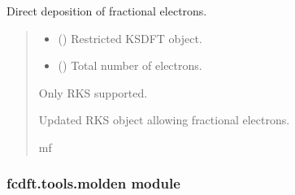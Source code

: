 \documentclass[letterpaper,10pt,english]{sphinxmanual}
\begin{document}
\begin{fulllineitems}
\label{\detokenize{fcdft.tools:fcdft.tools.addons.frac_occ_}}
\pysigstartsignatures
\pysiglinewithargsret
{}
{\sphinxparamcomma {}}
{}
\pysigstopsignatures
\sphinxAtStartPar
Direct deposition of fractional electrons.
\begin{quote}\begin{description}
\begin{itemize}
\item {} 
\sphinxAtStartPar
{} () \textendash{} Restricted KS\sphinxhyphen{}DFT object.

\item {} 
\sphinxAtStartPar
{} () \textendash{} Total number of electrons.

\end{itemize}

\sphinxAtStartPar
{} \textendash{} Only RKS supported.

\sphinxAtStartPar
Updated RKS object allowing fractional electrons.

\sphinxAtStartPar
mf

\end{description}\end{quote}

\end{fulllineitems}



\subsubsection{fcdft.tools.molden module}
\label{\detokenize{fcdft.tools:module-fcdft.tools.molden}}\label{\detokenize{fcdft.tools:fcdft-tools-molden-module}}
\end{document}
